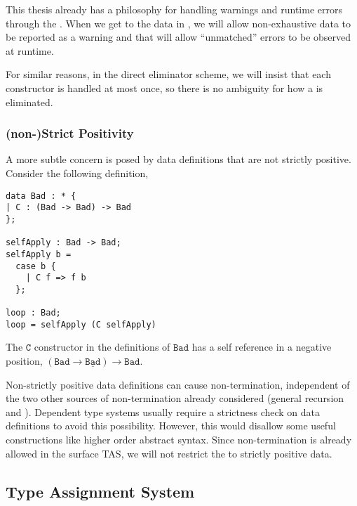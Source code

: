 
This thesis already has a philosophy for handling warnings and runtime errors through the \clang{}.
When we get to the \clang{} data in , we will allow non-exhaustive data to be reported as a warning and that will allow ``unmatched'' errors to be observed at runtime.

For similar reasons, in the direct eliminator scheme, we will insist that each constructor is handled at most once, so there is no ambiguity for how a \case{} is eliminated.

\subsubsection{(non-)Strict Positivity}

A more subtle concern is posed by data definitions that are not strictly positive.
Consider the following definition, 

\begin{lstlisting}[basicstyle={\ttfamily\small}]
data Bad : * {
| C : (Bad -> Bad) -> Bad
};

selfApply : Bad -> Bad;
selfApply b =
  case b {
    | C f => f b
  };

loop : Bad;
loop = selfApply (C selfApply)
\end{lstlisting}

The $\mathtt{C}$ constructor in the definitions of $\mathtt{Bad}$ has a self reference in a negative position, $(\mathtt{Bad}\rightarrow\underline{\mathtt{Bad}})\rightarrow\mathtt{Bad}$. 

Non-strictly positive data definitions can cause non-termination, independent of the two other sources of non-termination already considered (general recursion and \tit{}).
Dependent type systems usually require a strictness check on data definitions to avoid this possibility.
However, this would disallow some useful constructions like higher order abstract syntax. %
Since non-termination is already allowed in the surface \ac{TAS}, we will not restrict the \slang{} to strictly positive data.



\subsection{Type Assignment System}

